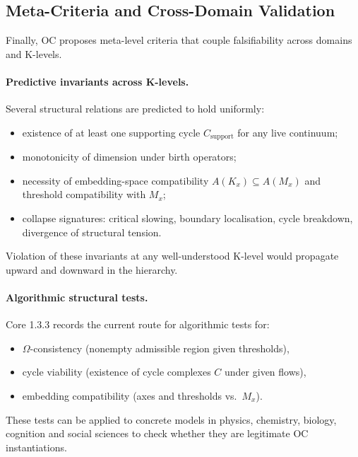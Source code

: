 \subsection{Meta-Criteria and Cross-Domain Validation}

Finally, OC proposes meta-level criteria that couple falsifiability across
domains and K-levels.

\paragraph{Predictive invariants across K-levels.}
Several structural relations are predicted to hold uniformly:
\begin{itemize}
  \item existence of at least one supporting cycle \(C_{\mathrm{support}}\)
        for any live continuum;
  \item monotonicity of dimension under birth operators;
  \item necessity of embedding-space compatibility
        \(A(K_x)\subseteq A(M_x)\) and threshold compatibility with \(M_x\);
  \item collapse signatures: critical slowing, boundary localisation,
        cycle breakdown, divergence of structural tension.
\end{itemize}
Violation of these invariants at any well-understood K-level would
propagate upward and downward in the hierarchy.

\paragraph{Algorithmic structural tests.}
Core 1.3.3 records the current route for algorithmic tests for:
\begin{itemize}
  \item \(\Omega\)-consistency (nonempty admissible region given thresholds),
  \item cycle viability (existence of cycle complexes \(C\) under given
        flows),
  \item embedding compatibility (axes and thresholds vs.\ \(M_x\)).
\end{itemize}
These tests can be applied to concrete models in physics, chemistry,
biology, cognition and social sciences to check whether they are legitimate
OC instantiations.

